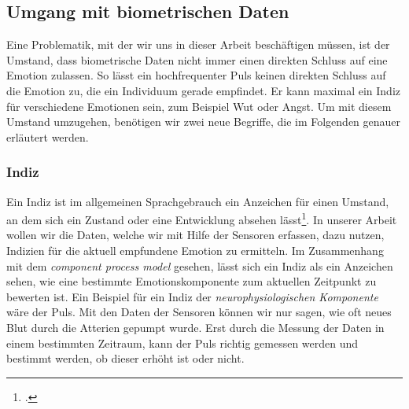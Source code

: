 \subsection{Umgang mit biometrischen Daten}
Eine Problematik, mit der wir uns in dieser Arbeit beschäftigen müssen, ist der Umstand, dass biometrische Daten nicht immer einen direkten Schluss auf eine Emotion zulassen. So lässt ein hochfrequenter Puls keinen direkten Schluss auf die Emotion zu, die ein Individuum gerade empfindet. Er kann maximal ein Indiz für verschiedene Emotionen sein, zum Beispiel Wut oder Angst. Um mit diesem Umstand umzugehen, benötigen wir zwei neue Begriffe, die im Folgenden genauer erläutert werden. 
\subsubsection{Indiz}
Ein Indiz ist im allgemeinen Sprachgebrauch ein Anzeichen für einen Umstand, an dem sich ein Zustand oder eine Entwicklung absehen lässt\footcite[Vgl.][]{Dud18}. In unserer Arbeit wollen wir die Daten, welche wir mit Hilfe der Sensoren erfassen, dazu nutzen, Indizien für die aktuell empfundene Emotion zu ermitteln. Im Zusammenhang mit dem \textit{component process model} gesehen, lässt sich ein Indiz als ein Anzeichen sehen, wie eine bestimmte Emotionskomponente zum aktuellen Zeitpunkt zu bewerten ist. Ein Beispiel für ein Indiz der \textit{neurophysiologischen Komponente} wäre der Puls. Mit den Daten der Sensoren können wir nur sagen, wie oft neues Blut durch die Atterien gepumpt wurde. Erst durch die Messung der Daten in einem bestimmten Zeitraum, kann der Puls richtig gemessen werden und bestimmt werden, ob dieser erhöht ist oder nicht.
